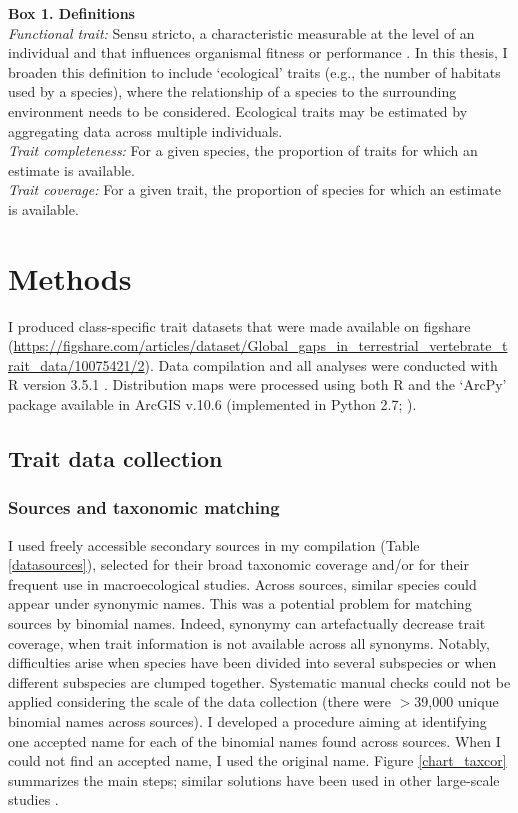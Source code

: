 \clearpage

\begin{mdframed}
\label{Trait_definition_box}
\textbf{Box 1. Definitions}\\
\textit{Functional trait:} Sensu stricto, a characteristic measurable at the level of an individual and that influences organismal fitness or performance \citep{Violle2007}. In this thesis, I broaden this definition to include `ecological' traits (e.g., the number of habitats used by a species), where the relationship of a species to the surrounding environment needs to be considered. Ecological traits may be estimated by aggregating data across multiple individuals.\\
\textit{Trait completeness:} For a given species, the proportion of traits for which an estimate is available.\\
\textit{Trait coverage:} For a given trait, the proportion of species for which an estimate is available.
\end{mdframed}


\section{Methods}

I produced class-specific trait datasets that were made available on figshare (\url{https://figshare.com/articles/dataset/Global_gaps_in_terrestrial_vertebrate_trait_data/10075421/2}).
Data compilation and all analyses were conducted with R version 3.5.1 \citep{R_citation}.
Distribution maps were processed using both R and the `ArcPy' package available in ArcGIS v.10.6 \citep{ESRI} (implemented in Python 2.7; \citet{Python_citation}).

\subsection{Trait data collection}

\subsubsection{Sources and taxonomic matching}

I used freely accessible secondary sources in my compilation (Table \ref{datasources}), selected for their broad taxonomic coverage and/or for their frequent use in macroecological studies. Across sources, similar species could appear under synonymic names. This was a potential problem for matching sources by binomial names. Indeed, synonymy can artefactually decrease trait coverage, when trait information is not available across all synonyms. Notably, difficulties arise when species have been divided into several subspecies or when different subspecies are clumped together. Systematic manual checks could not be applied considering the scale of the data collection (there were $>$39,000 unique binomial names across sources). I developed a procedure aiming at identifying one accepted name for each of the binomial names found across sources. When I could not find an accepted name, I used the original name. Figure \ref{chart_taxcor} summarizes the main steps; similar solutions have been used in other large-scale studies \citep{Cooke2019b}.

